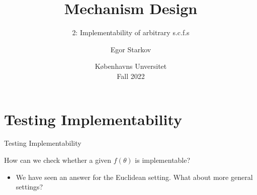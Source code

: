 \documentclass[english,10pt
,aspectratio=169
]{beamer}
\title{Mechanism Design}
\subtitle{2: Implementability of arbitrary s.c.f.s}
\author{Egor Starkov}
\date{K{\o}benhavns Unversitet \\
	Fall 2022}
\begin{document}
	\frame[plain]{\titlepage}



\section{Testing Implementability}

\begin{frame}{Testing Implementability}
	\begin{exampleblock}{}
		How can we check whether a given $f(\theta)$ is implementable?
	\end{exampleblock} 
	\begin{itemize}
		\item We have seen an answer for the Euclidean setting. What about more general settings?
	\end{itemize}
\end{frame}


%		
\end{document}
